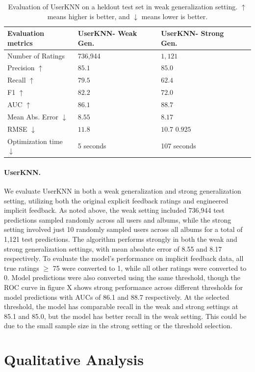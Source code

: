 \documentclass{article}
\newcommand{\userknn}{UserKNN\xspace}
\begin{document}
 \begin{table}[h]
	\centering
	\begin{tabular}{@{}llll@{}}
		\toprule
		Evaluation metrics    & \userknn - Weak Gen. & \userknn - Strong Gen. 
		\\ \midrule
		Number of Ratings			  & 736,944				&$1,121$ \\
		Precision $\uparrow$          & $85.1$               & $85.0$
		\\
		Recall	$\uparrow$              & $79.5$               & $62.4$
		\\
		F1	$\uparrow$                  & $82.2$               & $72.0$
		\\
		AUC $\uparrow$					& $86.1$				& $88.7$
		\\
		Mean Abs. Error	$\downarrow$       & $8.55$             & $8.17$
		\\
		RMSE	$\downarrow$              & $11.8$              &$10.7$
		$0.925$
		\\
		Optimization time	$\downarrow$ & 5 seconds
		                              & 107 seconds
		\\ \bottomrule
	\end{tabular}
	\caption{Evaluation of \userknn on a heldout
		test set in weak generalization setting. $\uparrow$ means higher is better, and $\downarrow$
		means lower is better.}
	\label{tab:userknn-results}

\end{table}

\paragraph*{\userknn.} We evaluate \userknn in both a weak generalization and strong
generalization setting, utilizing both the original explicit feedback ratings and engineered
implicit feedback. As noted above, the weak setting included 736,944 test predictions
sampled randomly across all users and albums, while the strong setting involved just 10 
randomly sampled users across all albums for a total of 1,121 test predictions. 
The algorithm performs strongly in both the weak and strong generalization
settings, with mean absolute error of 8.55 and 8.17 respectively. To evaluate the model's
performance on implicit feedback data, all true ratings $\geq$ 75 were converted to 1, while
all other ratings were converted to 0. Model predictions were also converted using the same
threshold, though the ROC curve in figure X shows strong performance across different
thresholds for model predictions with AUCs of 86.1 and 88.7 respectively. At the selected
threshold, the model has comparable recall in the weak and strong settings at 85.1 and 85.0, 
but the model has better recall in the weak setting. This could be due to the small sample
size in the strong setting or the threshold selection. 

\section{Qualitative Analysis}

\newpage


\end{document}
